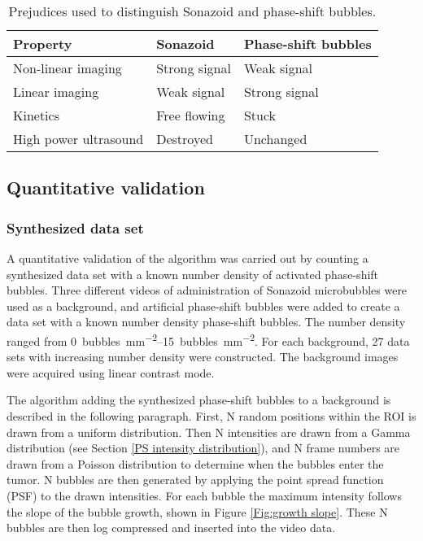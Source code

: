 \begin{table}[H]
\caption{Prejudices used to distinguish Sonazoid\texttrademark{} and phase-shift bubbles.}
\label{tab:qualitative}
\begin{center}
\begin{tabular}{@{}l l l @{}}
  \toprule
  Property & Sonazoid\texttrademark{} & Phase-shift bubbles \\
  \midrule
  Non-linear imaging & Strong signal & Weak signal \\
  Linear imaging & Weak signal & Strong signal \\
  Kinetics & Free flowing & Stuck \\
  High power ultrasound & Destroyed &Unchanged\\
  \bottomrule
\end{tabular}
\end{center}
\end{table}


\subsection{Quantitative validation}
\subsubsection{Synthesized data set}
A quantitative validation of the algorithm was carried out by counting a synthesized data set with a known number density of activated phase-shift bubbles. Three different videos of administration of Sonazoid\texttrademark{} microbubbles were used as a background, and artificial phase-shift bubbles were added to create a data set with a known number density phase-shift bubbles. The number density ranged from \SIrange[per-mode=symbol]{0}{15}{bubbles\per\milli\meter\squared}. For each background, 27 data sets with increasing number density were constructed. The background images were acquired using linear contrast mode.

The algorithm adding the synthesized phase-shift bubbles to a background is described in the following paragraph. First, N random positions within the ROI is drawn from a uniform distribution. Then N intensities are drawn from a Gamma distribution (see Section \ref{PS intensity distribution}), and N frame numbers are drawn from a Poisson distribution to determine when the bubbles enter the tumor. N bubbles are then generated by applying the point spread function (PSF) to the drawn intensities. For each bubble the maximum intensity follows the slope of the bubble growth, shown in Figure \ref{Fig:growth slope}. These N bubbles are then log compressed and inserted into the video data. 


